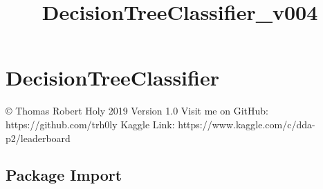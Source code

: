 \documentclass[paper=landscape]{scrartcl}
\title{DecisionTreeClassifier\_v004}
\begin{document}
    
    \maketitle
    
    

    
    \hypertarget{decisiontreeclassifier}{%
\section{DecisionTreeClassifier}\label{decisiontreeclassifier}}

© Thomas Robert Holy 2019 Version 1.0 Visit me on GitHub:
https://github.com/trh0ly Kaggle Link:
https://www.kaggle.com/c/dda-p2/leaderboard

\hypertarget{package-import}{%
\subsection{Package Import}\label{package-import}}
\end{document}
